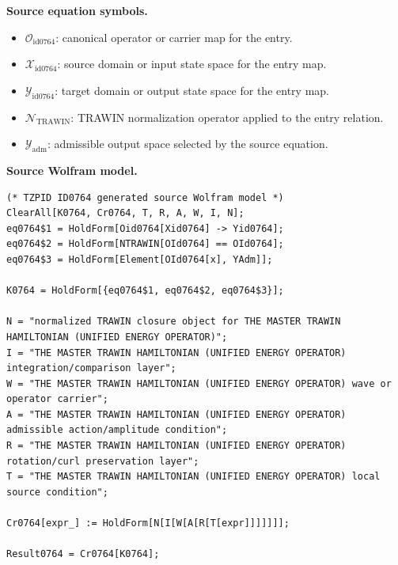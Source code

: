 \begin{minipage}[t]{0.49\linewidth}
\begingroup
\small
\raggedright
\textbf{Source equation symbols.}\par
\begin{itemize}[leftmargin=1.35em,itemsep=1pt,topsep=1pt,parsep=0pt]
    \item $\mathcal{O}_{\mathrm{id0764}}$: canonical operator or carrier map for the entry.
    \item $\mathcal{X}_{\mathrm{id0764}}$: source domain or input state space for the entry map.
    \item $\mathcal{Y}_{\mathrm{id0764}}$: target domain or output state space for the entry map.
    \item $\mathcal{N}_{\mathrm{TRAWIN}}$: TRAWIN normalization operator applied to the entry relation.
    \item $\mathcal{Y}_{\mathrm{adm}}$: admissible output space selected by the source equation.
\end{itemize}
\endgroup
\end{minipage}\hfill
\begin{minipage}[t]{0.47\linewidth}
\begingroup
\scriptsize
\raggedright
\textbf{Source Wolfram model.}\par
\begin{Verbatim}[fontsize=\tiny,breaklines=true,breakanywhere=true]
(* TZPID ID0764 generated source Wolfram model *)
ClearAll[K0764, Cr0764, T, R, A, W, I, N];
eq0764$1 = HoldForm[Oid0764[Xid0764] -> Yid0764];
eq0764$2 = HoldForm[NTRAWIN[OId0764] == OId0764];
eq0764$3 = HoldForm[Element[OId0764[x], YAdm]];

K0764 = HoldForm[{eq0764$1, eq0764$2, eq0764$3}];

N = "normalized TRAWIN closure object for THE MASTER TRAWIN HAMILTONIAN (UNIFIED ENERGY OPERATOR)";
I = "THE MASTER TRAWIN HAMILTONIAN (UNIFIED ENERGY OPERATOR) integration/comparison layer";
W = "THE MASTER TRAWIN HAMILTONIAN (UNIFIED ENERGY OPERATOR) wave or operator carrier";
A = "THE MASTER TRAWIN HAMILTONIAN (UNIFIED ENERGY OPERATOR) admissible action/amplitude condition";
R = "THE MASTER TRAWIN HAMILTONIAN (UNIFIED ENERGY OPERATOR) rotation/curl preservation layer";
T = "THE MASTER TRAWIN HAMILTONIAN (UNIFIED ENERGY OPERATOR) local source condition";

Cr0764[expr_] := HoldForm[N[I[W[A[R[T[expr]]]]]]];

Result0764 = Cr0764[K0764];
\end{Verbatim}
\endgroup
\end{minipage}

